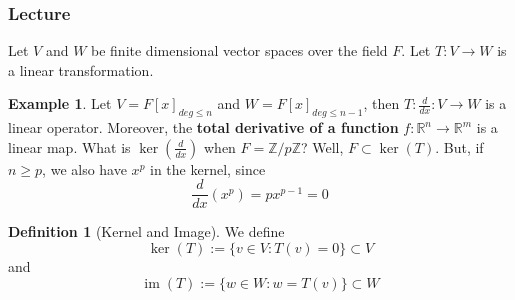 \documentclass[12pt]{article}
\theoremstyle{definition}
\newtheorem{defn}[thm]{Definition}
\newtheorem{eg}[thm]{Example}
\theoremstyle{remark}
\numberwithin{equation}{section}
\newcommand\R{\mathbb R}    %
\newcommand\Z{\mathbb Z}    %
\newcommand\B[1]{\textbf{ #1}}
\DeclareMathOperator{\im}{im}
\begin{document}
\vspace{15pt}




\subsubsection{Lecture}


Let $V$ and $W$ be finite dimensional vector spaces over the field $F$. Let $T:V\rightarrow W$ is a linear transformation.

\begin{eg}
        Let $V = F[x]_{deg\leq n}$ and $W = F[x]_{deg\leq n -1}$, then $T:\frac{d}{dx}:V\rightarrow W$ is a linear operator. Moreover, the \B{total derivative of a function} $f:\R^n \rightarrow \R^m$ is a linear map. What is $\ker\left(\frac{d}{dx}\right)$ when $F = \Z/p\Z$? Well, $F \subset \ker(T)$. But, if $n \geq p$, we also have $x^p$ in the kernel, since \begin{equation}
                \frac{d}{dx}(x^p) = px^{p-1} = 0
        \end{equation}
\end{eg}

\vspace{15pt}

\begin{defn}[Kernel and Image]
        We define \begin{equation}
                \ker(T) := \{v \in V: T(v) = 0\} \subset V
        \end{equation}
        and \begin{equation}
                \im(T) := \{w \in W: w = T(v)\} \subset W
        \end{equation}
\end{defn}

\vspace{15pt}
\end{document}
